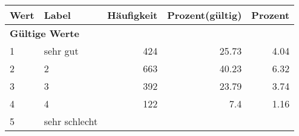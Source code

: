      \begin{longtable}{lXrrr}
     \toprule
     \textbf{Wert} & \textbf{Label} & \textbf{Häufigkeit} & \textbf{Prozent(gültig)} & \textbf{Prozent} \\
     \endhead
     \midrule
     \multicolumn{5}{l}{\textbf{Gültige Werte}}\\

     1 &
     \multicolumn{1}{X}{ sehr gut   } &


       \num{424} &
       \num[round-mode=places,round-precision=2]{25,73} &
         \num[round-mode=places,round-precision=2]{4,04} \\

     2 &
     \multicolumn{1}{X}{ 2   } &


       \num{663} &
       \num[round-mode=places,round-precision=2]{40,23} &
         \num[round-mode=places,round-precision=2]{6,32} \\

     3 &
     \multicolumn{1}{X}{ 3   } &


       \num{392} &
       \num[round-mode=places,round-precision=2]{23,79} &
         \num[round-mode=places,round-precision=2]{3,74} \\

     4 &
     \multicolumn{1}{X}{ 4   } &


       \num{122} &
       \num[round-mode=places,round-precision=2]{7,4} &
         \num[round-mode=places,round-precision=2]{1,16} \\

     5 &
     \multicolumn{1}{X}{ sehr schlecht   } &



\end{longtable}
